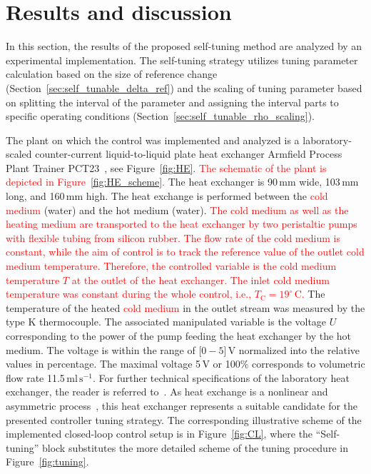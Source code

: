 \documentclass[preprint,12pt]{elsarticle}
\newcommand{\change}[1]{\textcolor{red}{#1}}
\begin{document}
	
	\section{Results and discussion}
	\label{sec:results}
	
	In this section, the results of the proposed self-tuning method are analyzed by an experimental implementation. The self-tuning strategy utilizes tuning parameter calculation based on the size of reference change (Section~\ref{sec:self_tunable_delta_ref}) and the scaling of tuning parameter based on splitting the interval of the parameter and assigning the interval parts to specific operating conditions (Section~\ref{sec:self_tunable_rho_scaling}).

	The plant on which the control was implemented and analyzed is a laboratory-scaled counter-current liquid-to-liquid plate heat exchanger Armfield Process Plant Trainer PCT23~\cite{pct23}, see Figure~\ref{fig:HE}. \change{The schematic of the plant is depicted in Figure~\ref{fig:HE_scheme}.} The heat exchanger is 90\,mm wide, 103\,mm long, and 160\,mm high. The heat exchange is performed between the \change{cold medium} (water) and the hot medium (water). \change{The cold medium as well as the heating medium are transported to the heat exchanger by two peristaltic pumps with flexible tubing from silicon rubber. The flow rate of the cold medium is constant, while the aim of control is to track the reference value of the outlet cold medium temperature. Therefore, the controlled variable is the \change{cold medium} temperature $T$ at the outlet of the heat exchanger. The inlet cold medium temperature was constant during the whole control, i.e., $T_\mathrm{C} = 19^{\circ}$\,C.} The temperature of the heated \change{cold medium} in the outlet stream was measured by the type K thermocouple. The associated manipulated variable is the voltage $U$ corresponding to the power of the pump feeding the heat exchanger by the hot medium. The voltage is within the range of [$0-5$]\,V normalized into the relative values in percentage. The maximal voltage 5\,V or 100\% corresponds to volumetric flow rate 11.5\,$\mathrm{ml}\,\mathrm{s}^{-1}$. For further technical specifications of the laboratory heat exchanger, the reader is referred to~\cite{pct23}. As heat exchange is a nonlinear and asymmetric process~\cite{Liptak}, this heat exchanger represents a suitable candidate for the presented controller tuning strategy. The corresponding illustrative scheme of the implemented closed-loop control setup is in Figure~\ref{fig:CL}, where the ``Self-tuning'' block substitutes the more detailed scheme of the tuning procedure in Figure~\ref{fig:tuning}.  
\end{document}
